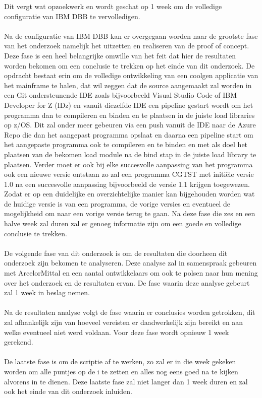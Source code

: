 Dit vergt wat opzoekwerk en wordt geschat op 1 week om de volledige configuratie van IBM DBB te vervolledigen. 
\\ \\
Na de configuratie van IBM DBB kan er overgegaan worden naar de grootste fase van het onderzoek namelijk het uitzetten en realiseren van de proof of concept.
Deze fase is een heel belangrijke omwille van het feit dat hier de resultaten worden bekomen om een conclusie te trekken op het einde van dit onderzoek. 
De opdracht bestaat erin om de volledige ontwikkeling van een coolgen applicatie van het mainframe te halen, 
dat wil zeggen dat de source aangemaakt zal worden in een Git ondersteunende IDE zoals bijvoorbeeld Visual Studio Code of IBM Developer for Z (IDz) en vanuit diezelfde IDE een pipeline 
gestart wordt om het programma dan te compileren en binden en te plaatsen in de juiste load libraries op z/OS.
Dit zal onder meer gebeuren via een push vanuit de IDE naar de Azure Repo die dan het aangepast programma opslaat en daarna een pipeline start om het aangepaste programma ook 
te compileren en te binden en met als doel het plaatsen van de bekomen load module na de bind stap in de juiste load library te plaatsen.
Verder moet er ook bij elke succesvolle aanpassing van het programma ook een nieuwe versie ontstaan zo zal een programma CGTST met initiële versie 1.0 na een succesvolle 
aanpassing bijvoorbeeld de versie 1.1 krijgen toegewezen. 
Zodat er op een duidelijke en overzichtelijke manier kan bijgehouden worden wat de huidige versie is van een programma, de vorige versies en eventueel de mogelijkheid om naar een vorige versie terug te gaan.
Na deze fase die zes en een halve week zal duren zal er genoeg informatie zijn om een goede en volledige conclusie te trekken. 
\\ \\
De volgende fase van dit onderzoek is om de resultaten die doorheen dit onderzoek zijn bekomen te analyseren. 
Deze analyse zal in samenspraak gebeuren met ArcelorMittal en een aantal ontwikkelaars om ook te polsen naar hun mening over het onderzoek en de resultaten ervan. 
De fase waarin deze analyse gebeurt zal 1 week in beslag nemen.
\\ \\
Na de resultaten analyse volgt de fase waarin er conclusies worden getrokken, dit zal afhankelijk zijn van hoeveel vereisten er daadwerkelijk zijn bereikt en aan welke eventueel niet werd voldaan. 
Voor deze fase wordt opnieuw 1 week gerekend.
\\ \\
De laatste fase is om de scriptie af te werken, zo zal er in die week gekeken worden om alle puntjes op de i te zetten en alles nog eens goed na te kijken alvorens in te dienen.
Deze laatste fase zal niet langer dan 1 week duren en zal ook het einde van dit onderzoek inluiden.  



